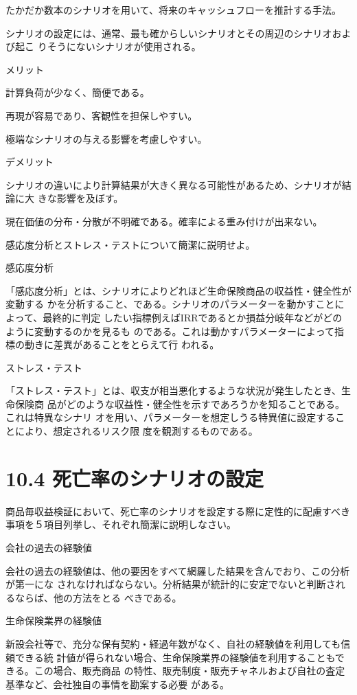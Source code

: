 \documentclass[report,gutter=10mm,fore-edge=10mm,uplatex,dvipdfmx]{jlreq}
\begin{document}
たかだか数本のシナリオを用いて、将来のキャッシュフローを推計する手法。

シナリオの設定には、通常、最も確からしいシナリオとその周辺のシナリオおよび起こ
りそうにないシナリオが使用される。

メリット

計算負荷が少なく、簡便である。

再現が容易であり、客観性を担保しやすい。

極端なシナリオの与える影響を考慮しやすい。

デメリット

シナリオの違いにより計算結果が大きく異なる可能性があるため、シナリオが結論に大
きな影響を及ぼす。

現在価値の分布・分散が不明確である。確率による重み付けが出来ない。


感応度分析とストレス・テストについて簡潔に説明せよ。

\answer{}

感応度分析

「感応度分析」とは、シナリオによりどれほど生命保険商品の収益性・健全性が変動する
かを分析すること、である。シナリオのパラメーターを動かすことによって、最終的に判定
したい指標例えばIRRであるとか損益分岐年などがどのように変動するのかを見るも
のである。これは動かすパラメーターによって指標の動きに差異があることをとらえて行
われる。

ストレス・テスト

「ストレス・テスト」とは、収支が相当悪化するような状況が発生したとき、生命保険商
品がどのような収益性・健全性を示すであろうかを知ることである。これは特異なシナリ
オを用い、パラメーターを想定しうる特異値に設定することにより、想定されるリスク限
度を観測するものである。


\section{10.4 死亡率のシナリオの設定}
商品毎収益検証において、死亡率のシナリオを設定する際に定性的に配慮すべき事項を５項目列挙し、それぞれ簡潔に説明しなさい。
\answer{}

会社の過去の経験値

会社の過去の経験値は、他の要因をすべて網羅した結果を含んでおり、この分析が第一にな
されなければならない。分析結果が統計的に安定でないと判断されるならば、他の方法をとる
べきである。

生命保険業界の経験値

新設会社等で、充分な保有契約・経過年数がなく、自社の経験値を利用しても信頼できる統
計値が得られない場合、生命保険業界の経験値を利用することもできる。この場合、販売商品
の特性、販売制度・販売チャネルおよび自社の査定基準など、会社独自の事情を勘案する必要
がある。
\end{document}
